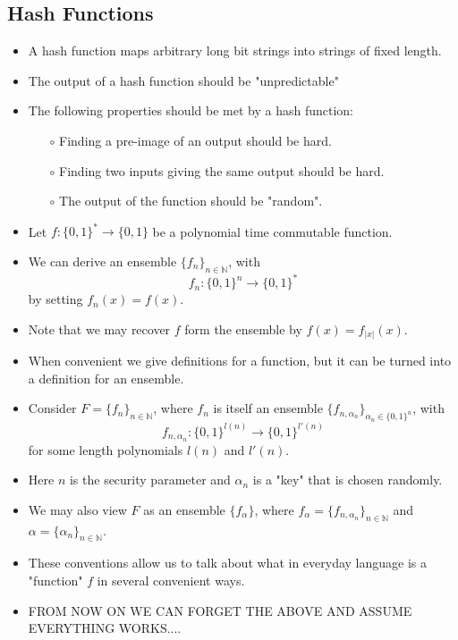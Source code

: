 \documentclass[a4paper]{scrartcl}
\begin{document}
\subsection*{Hash Functions}
\begin{itemize}
\item A hash function maps arbitrary long bit strings into strings of fixed length.
\item The output of a hash function should be "unpredictable"
\item The following properties should be met by a hash function:
\begin{itemize}
\item [$\circ$] Finding a pre-image of an output should be hard.
\item [$\circ$] Finding two inputs giving the same output should be hard.
\item [$\circ$] The output of the function should be "random".
\end{itemize}
\item Let $f: \{0,1\}^* \rightarrow \{0,1\}$ be a polynomial time commutable function.
\item We can derive an ensemble $\{f_n\}_{n \in \mathbb{N}}$, with $$f_n: \{0,1\}^n \rightarrow \{0,1\}^*$$ by setting $f_n(x) = f(x)$.
\item Note that we may recover $f$ form the ensemble by $f(x) = f_{|x|}(x)$.
\item When convenient we give definitions for a function, but it can be turned into a definition for an ensemble.
\item Consider $F=\{f_n\}_{n \in \mathbb{N}}$, where $f_n$ is itself an ensemble $\{f_{n,\alpha_n}\}_{\alpha_n \in \{0,1\}^n}$, with $$f_{n,\alpha_n}:\{0,1\}^{l(n)} \rightarrow \{0,1\}^{l'(n)}$$ for some length polynomials $l(n)$ and $l'(n)$.
\item Here $n$ is the security parameter and $\alpha_n$ is a "key" that is chosen randomly.
\item We may also view $F$ as an ensemble $\{f_\alpha\}$, where $f_\alpha = \{f_{n,\alpha_n}\}_{n \in \mathbb{N}}$ and $\alpha = \{\alpha_n\}_{n \in \mathbb{N}}$.
\item These conventions allow us to talk about what in everyday language is a "function" $f$ in several convenient ways.
\item FROM NOW ON WE CAN FORGET THE ABOVE AND ASSUME EVERYTHING WORKS....
\end{itemize}
\end{document}
